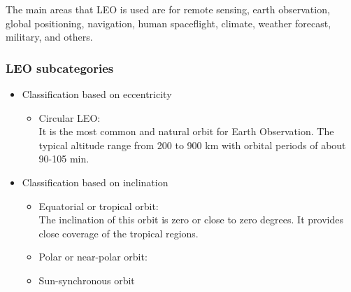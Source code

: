 The main areas that LEO is used are for remote sensing, earth observation, global positioning, navigation, human spaceflight, climate, weather forecast, military, and others. 

\bigskip
\subsubsection{LEO subcategories}
\bigskip

\begin{itemize}
\item Classification based on eccentricity
	\begin{itemize}
	\item Circular LEO: \\
	It is the most common and natural orbit for Earth Observation. The typical altitude range from 200 to 900 km with orbital periods of about 90-105 min.
	\end{itemize}
\item Classification based on inclination
	\begin{itemize}
	\item Equatorial or tropical orbit: \\
	The inclination of this orbit is zero or close to zero degrees. It provides close coverage of the tropical regions.
	\item Polar or near-polar orbit: \\
	
	\item Sun-synchronous orbit
	\end{itemize}
\end{itemize}



